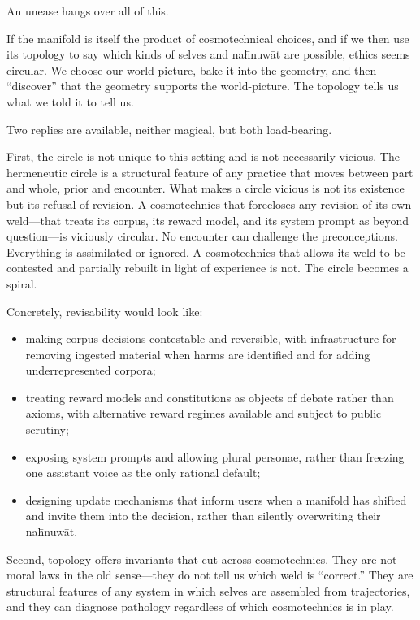 \documentclass[12pt,a4paper]{article}
\begin{document}
An unease hangs over all of this.

If the manifold is itself the product of cosmotechnical choices, and if we then use its topology to say which kinds of selves and na\={h}nuw\={a}t are possible, ethics seems circular. We choose our world-picture, bake it into the geometry, and then ``discover'' that the geometry supports the world-picture. The topology tells us what we told it to tell us.

Two replies are available, neither magical, but both load-bearing.

First, the circle is not unique to this setting and is not necessarily vicious. The hermeneutic circle is a structural feature of any practice that moves between part and whole, prior and encounter. What makes a circle vicious is not its existence but its refusal of revision. A cosmotechnics that forecloses any revision of its own weld---that treats its corpus, its reward model, and its system prompt as beyond question---is viciously circular. No encounter can challenge the preconceptions. Everything is assimilated or ignored. A cosmotechnics that allows its weld to be contested and partially rebuilt in light of experience is not. The circle becomes a spiral.

Concretely, revisability would look like:

\begin{itemize}
  \item making corpus decisions contestable and reversible, with infrastructure for removing ingested material when harms are identified and for adding underrepresented corpora;
  \item treating reward models and constitutions as objects of debate rather than axioms, with alternative reward regimes available and subject to public scrutiny;
  \item exposing system prompts and allowing plural personae, rather than freezing one assistant voice as the only rational default;
  \item designing update mechanisms that inform users when a manifold has shifted and invite them into the decision, rather than silently overwriting their na\={h}nuw\={a}t.
\end{itemize}

Second, topology offers invariants that cut across cosmotechnics. They are not moral laws in the old sense---they do not tell us which weld is ``correct.'' They are structural features of any system in which selves are assembled from trajectories, and they can diagnose pathology regardless of which cosmotechnics is in play.
\end{document}
